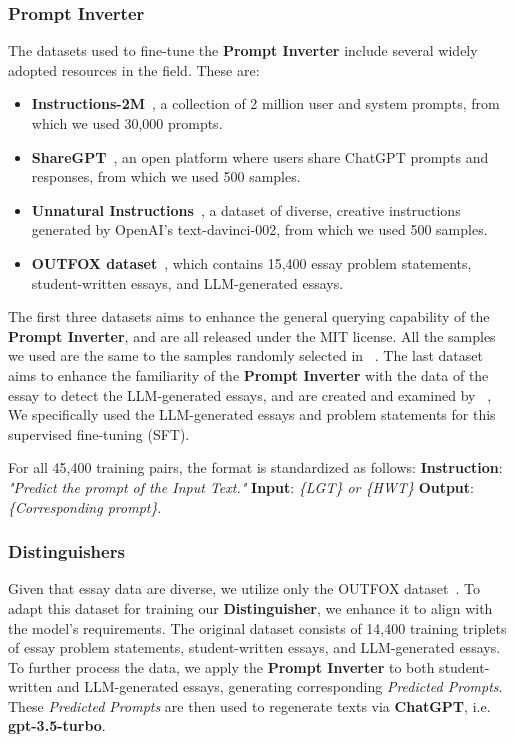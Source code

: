 \subsubsection{Prompt Inverter}
The datasets used to fine-tune the \textbf{Prompt Inverter} include several widely adopted resources in the field. These are:
\begin{itemize}[itemsep=1pt, topsep=1pt]
\item \textbf{Instructions-2M}~\cite{r5}, a collection of 2 million user and system prompts, from which we used 30,000 prompts.
\item \textbf{ShareGPT}~\cite{r6}, an open platform where users share ChatGPT prompts and responses, from which we used 500 samples.
\item \textbf{Unnatural Instructions}~\cite{r6}, a dataset of diverse, creative instructions generated by OpenAI’s text-davinci-002, from which we used 500 samples.
\item \textbf{OUTFOX dataset}~\cite{r3}, which contains 15,400 essay problem statements, student-written essays, and LLM-generated essays.
\end{itemize}
The first three datasets aims to enhance the general querying capability of the \textbf{Prompt Inverter}, and are all released under the MIT license. All the samples we used are the same to the samples randomly selected in ~\cite{r4}. The last dataset aims to enhance the familiarity of the \textbf{Prompt Inverter} with the data of the essay to detect the LLM-generated essays, and are created and examined by ~\citet{r3}, We specifically used the LLM-generated essays and problem statements for this supervised fine-tuning (SFT).

For all 45,400 training pairs, the format is standardized as follows:  
\textbf{Instruction}: \textit{"Predict the prompt of the Input Text."} \textbf{Input}: \textit{\{LGT\} or \{HWT\}} \textbf{Output}: \textit{\{Corresponding prompt\}}.


\subsubsection{Distinguishers}
Given that essay data are diverse, we utilize only the OUTFOX dataset~\cite{r3}. To adapt this dataset for training our \textbf{Distinguisher}, we enhance it to align with the model's requirements. The original dataset consists of 14,400 training triplets of essay problem statements, student-written essays, and LLM-generated essays. To further process the data, we apply the \textbf{Prompt Inverter} to both student-written and LLM-generated essays, generating corresponding \textit{Predicted Prompts}. These \textit{Predicted Prompts} are then used to regenerate texts via \textbf{ChatGPT}, i.e. \textbf{gpt-3.5-turbo}.  

